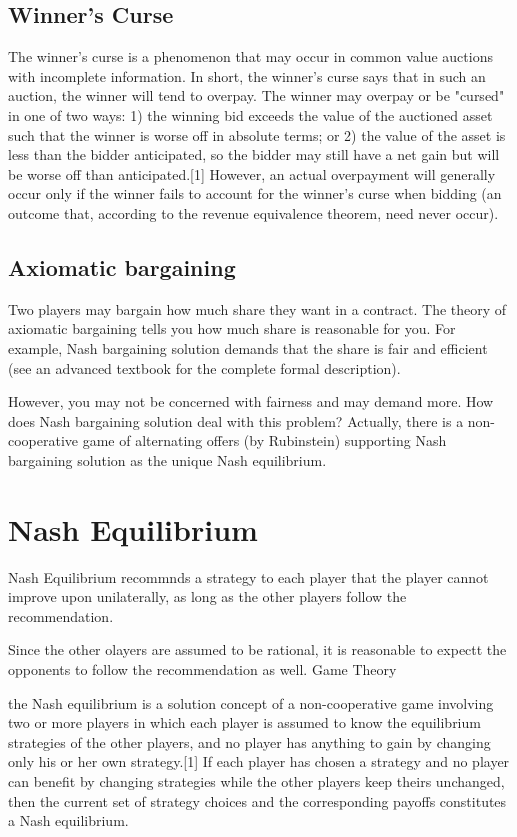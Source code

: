 \documentclass[]{report}
\begin{document}
\subsection{Winner's Curse}
The winner's curse is a phenomenon that may occur in common value auctions with incomplete information. In short, the winner's curse says that in such an auction, the winner will tend to overpay. The winner may overpay or be "cursed" in one of two ways: 1) the winning bid exceeds the value of the auctioned asset such that the winner is worse off in absolute terms; or 2) the value of the asset is less than the bidder anticipated, so the bidder may still have a net gain but will be worse off than anticipated.[1] However, an actual overpayment will generally occur only if the winner fails to account for the winner's curse when bidding (an outcome that, according to the revenue equivalence theorem, need never occur).

\subsection{Axiomatic bargaining}
Two players may bargain how much share they want in a contract. The theory of axiomatic bargaining tells you how much share is reasonable for you. For example, Nash bargaining solution demands that the share is fair and efficient (see an advanced textbook for the complete formal description).

However, you may not be concerned with fairness and may demand more. How does Nash bargaining solution deal with this problem? Actually, there is a non-cooperative game of alternating offers (by Rubinstein) supporting Nash bargaining solution as the unique Nash equilibrium.


\newpage
\section{Nash Equilibrium}

Nash Equilibrium recommnds a strategy to each player that the player cannot improve upon unilaterally, as long as the other players follow the recommendation.

Since the other olayers are assumed to be rational, it is reasonable to expectt the opponents to follow the recommendation as well.
Game Theory


the Nash equilibrium is a solution concept of a non-cooperative game involving two or more players in which each player is assumed to know the equilibrium strategies of the other players, and no player has anything to gain by changing only his or her own strategy.[1] If each player has chosen a strategy and no player can benefit by changing strategies while the other players keep theirs unchanged, then the current set of strategy choices and the corresponding payoffs constitutes a Nash equilibrium. 
\end{document}
